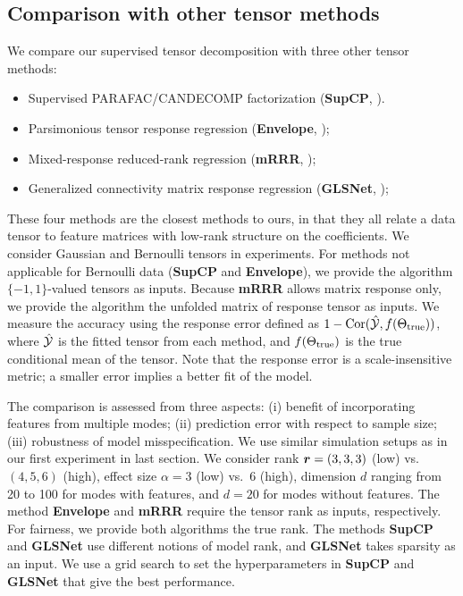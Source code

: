 \documentclass[12pt]{article}
\theoremstyle{definition}
\theoremstyle{definition}
\begin{document}
\subsection{Comparison with other tensor methods}
We compare our supervised tensor decomposition with three other tensor methods:

{  \begin{itemize}[noitemsep,topsep=0pt]
\item Supervised PARAFAC/CANDECOMP factorization (\textbf{SupCP}, \citep{lock2018supervised}).
    \item Parsimonious tensor response regression (\textbf{Envelope}, \citep{li2017parsimonious});
    \item Mixed-response reduced-rank regression (\textbf{mRRR}, \citep{luo2018leveraging});
    \item Generalized connectivity matrix response regression (\textbf{GLSNet}, \citep{zhang2018network});
\end{itemize}
}

{  These four methods are the closest methods to ours, in that they all relate a data tensor to feature matrices with low-rank structure on the coefficients.} We consider Gaussian and Bernoulli tensors in experiments. For methods not applicable for Bernoulli data ({\bf SupCP} and {\bf Envelope}), we provide the algorithm $\{-1,1\}$-valued tensors as inputs. Because {\bf mRRR} allows matrix response only, we provide the algorithm the unfolded matrix of response tensor as inputs. We measure the accuracy using the response error defined as $1-\text{Cor}(\hat {\mathcal{Y}}, f(\Theta_{\textup{true}}))$, where $\hat {\mathcal{Y}}$ is the fitted tensor from each method, and $f(\Theta_{\textup{true}})$ is the true conditional mean of the tensor. Note that the response error is a scale-insensitive metric; a smaller error implies a better fit of the model.


{  The comparison is assessed from three aspects: (i) benefit of incorporating features from multiple modes; (ii) prediction error with respect to sample size; (iii) robustness of model misspecification.} We use similar simulation setups as in our first experiment in last section. We consider rank $\bm{r}=(3,3,3)$ (low) vs.\ $(4,5,6)$ (high), effect size $\alpha = 3$ (low) vs.\ $6$ (high), dimension $d$ ranging from 20 to 100 for modes with features, and $d = 20$ for modes without features. The method \textbf{Envelope} and \textbf{mRRR} require the tensor rank as inputs, respectively. For fairness, we provide both algorithms the true rank. The methods \textbf{SupCP} and \textbf{GLSNet} use different notions of model rank, and \textbf{GLSNet} takes sparsity as an input. We use a grid search to set the hyperparameters in \textbf{SupCP} and \textbf{GLSNet} that give the best performance.
\end{document}
